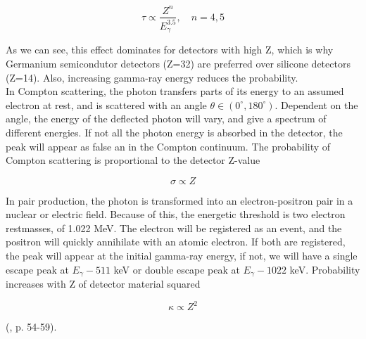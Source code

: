 \begin{equation}
    \tau \propto \frac{Z^n}{E_\gamma^{3.5}}, \quad n=4,5
\end{equation}

\noindent
As we can see, this effect dominates for detectors with high Z, which is why Germanium semicondutor detectors (Z=32) are preferred over silicone detectors (Z=14). Also, increasing gamma-ray energy reduces the probability. \\
\noindent In Compton scattering, the photon transfers parts of its energy to an assumed electron at rest, and is scattered with an angle $\theta \in (0^\circ, 180^\circ)$. Dependent on the angle, the energy of the deflected photon will vary, and give a spectrum of different energies. If not all the photon energy is absorbed in the detector, the peak will appear as false an in the Compton continuum. The probability of Compton scattering is proportional to the detector Z-value

\begin{equation}
    \sigma \propto Z
\end{equation}

\noindent 
In pair production, the photon is transformed into an electron-positron pair in a nuclear or electric field. Because of this, the energetic threshold is two electron restmasses, of 1.022 MeV. The electron will be registered as an event, and the positron will quickly annihilate with an atomic electron. If both are registered, the peak will appear at the initial gamma-ray energy, if not, we will have a single escape peak at $E_\gamma-511$ keV or double escape peak at $E_\gamma-1022$ keV. Probability increases with Z of detector material squared 

\begin{equation}
    \kappa\propto Z^2
\end{equation}

(\cite{Leo1994}, p. 54-59). 

